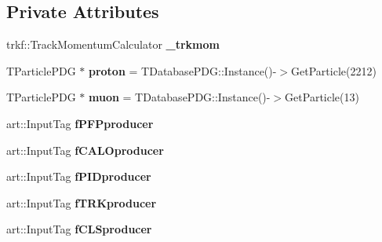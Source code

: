 \subsection*{Private Attributes}
\begin{DoxyCompactItemize}
\item 
trkf\+::\+Track\+Momentum\+Calculator {\bfseries \+\_\+trkmom}\hypertarget{classanalysis_1_1CalorimetryAnalysis_a831a5c89492a3a6e0ed31150f536de5a}{}\label{classanalysis_1_1CalorimetryAnalysis_a831a5c89492a3a6e0ed31150f536de5a}

\item 
T\+Particle\+P\+DG $\ast$ {\bfseries proton} = T\+Database\+P\+D\+G\+::\+Instance()-\/$>$Get\+Particle(2212)\hypertarget{classanalysis_1_1CalorimetryAnalysis_a459860690c1c2a7535a4e4536cc072e3}{}\label{classanalysis_1_1CalorimetryAnalysis_a459860690c1c2a7535a4e4536cc072e3}

\item 
T\+Particle\+P\+DG $\ast$ {\bfseries muon} = T\+Database\+P\+D\+G\+::\+Instance()-\/$>$Get\+Particle(13)\hypertarget{classanalysis_1_1CalorimetryAnalysis_ae00e5281f46f3a6b5732b5aa4a4c475d}{}\label{classanalysis_1_1CalorimetryAnalysis_ae00e5281f46f3a6b5732b5aa4a4c475d}

\item 
art\+::\+Input\+Tag {\bfseries f\+P\+F\+Pproducer}\hypertarget{classanalysis_1_1CalorimetryAnalysis_ada0564f052ca401fa887dee57a6f2589}{}\label{classanalysis_1_1CalorimetryAnalysis_ada0564f052ca401fa887dee57a6f2589}

\item 
art\+::\+Input\+Tag {\bfseries f\+C\+A\+L\+Oproducer}\hypertarget{classanalysis_1_1CalorimetryAnalysis_a619112b5bc6fba84f4f653b3f8d08bfb}{}\label{classanalysis_1_1CalorimetryAnalysis_a619112b5bc6fba84f4f653b3f8d08bfb}

\item 
art\+::\+Input\+Tag {\bfseries f\+P\+I\+Dproducer}\hypertarget{classanalysis_1_1CalorimetryAnalysis_a38269685e4531e8b46c1ec6d56ac25f0}{}\label{classanalysis_1_1CalorimetryAnalysis_a38269685e4531e8b46c1ec6d56ac25f0}

\item 
art\+::\+Input\+Tag {\bfseries f\+T\+R\+Kproducer}\hypertarget{classanalysis_1_1CalorimetryAnalysis_a8a450de3fc8eb42fdb3a884ce4f47d82}{}\label{classanalysis_1_1CalorimetryAnalysis_a8a450de3fc8eb42fdb3a884ce4f47d82}

\item 
art\+::\+Input\+Tag {\bfseries f\+C\+L\+Sproducer}\hypertarget{classanalysis_1_1CalorimetryAnalysis_a5100b4128868e63436fead3c31ffe996}{}\label{classanalysis_1_1CalorimetryAnalysis_a5100b4128868e63436fead3c31ffe996}


\end{DoxyCompactItemize}
